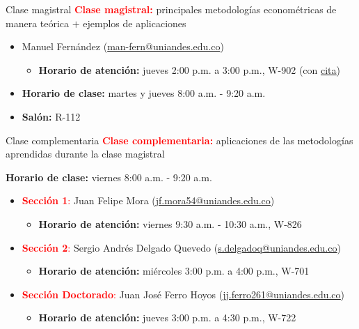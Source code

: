 \documentclass[10pt, xcolor=dvipsnames]{beamer}
\begin{document}
\begin{frame}{Clase magistral}
\textcolor{red}{\textbf{Clase magistral:}} principales metodologías econométricas de manera teórica $+$ ejemplos de aplicaciones %
\begin{itemize}
    \item Manuel Fernández (\href{mailto:man-fern@uniandes.edu.co}{man-fern@uniandes.edu.co})
    \begin{itemize}
        \item \textbf{Horario de atención:} jueves 2:00 p.m. a 3:00 p.m., W-902 (con \href{https://calendly.com/manuelfsb/horario-de-atencion}{\underline{cita}})
    \end{itemize}
    \item \textbf{Horario de clase:}  martes y jueves 8:00 a.m. - 9:20 a.m.
    \item \textbf{Salón:} R-112
\end{itemize}
\end{frame}

\begin{frame}{Clase complementaria}
\textcolor{red}{\textbf{Clase complementaria:}} aplicaciones de las metodologías aprendidas durante la clase magistral

\textbf{Horario de clase:} viernes 8:00 a.m. - 9:20 a.m. %
\begin{itemize}
    \item \textcolor{red}{\textbf{Sección 1}:} Juan Felipe Mora (\href{mailto:jf.mora54@uniandes.edu.co}{\underline{jf.mora54@uniandes.edu.co}})	
    \begin{itemize}
        \item \textbf{Horario de atención:} viernes 9:30 a.m. - 10:30 a.m., W-826
        \vspace{0.2cm}
    \end{itemize}	

    \item \textcolor{red}{\textbf{Sección 2}:} Sergio Andrés Delgado Quevedo (\href{mailto:s.delgadoq@uniandes.edu.co}{\underline{s.delgadoq@uniandes.edu.co}}) 	
    \begin{itemize}
        \item \textbf{Horario de atención:} miércoles 3:00 p.m. a 4:00 p.m., W-701 \vspace{0.2cm}	
    \end{itemize}
    \item \textcolor{red}{\textbf{Sección Doctorado}:} Juan José Ferro Hoyos (\href{mailto:jj.ferro261@uniandes.edu.co}{\underline{jj.ferro261@uniandes.edu.co}})	
    \begin{itemize}
        \item \textbf{Horario de atención:} jueves 3:00 p.m. a 4:30 p.m., W-722
    \end{itemize}
\end{itemize}
\end{frame}
\end{document}
